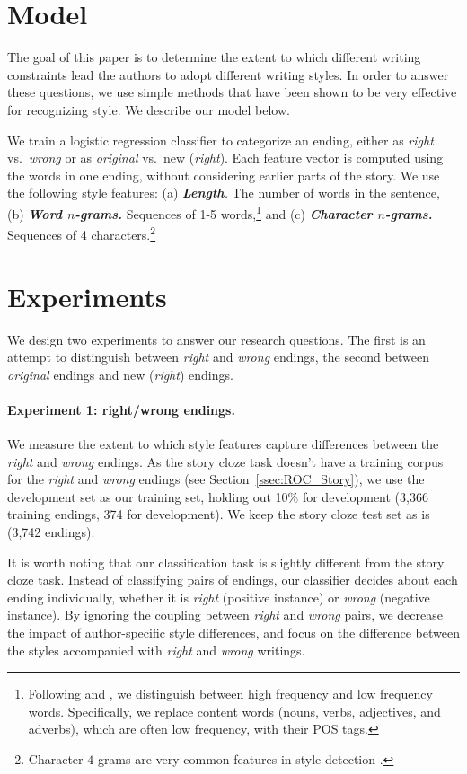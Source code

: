 \documentclass[11pt,a4paper]{article}
\newcommand{\secref}[1]{Section~\ref{ssec:#1}}
\newcommand{\isectionb}[1]{\section{#1}\label{ssec:#1}}
\newcommand{\resolved}[1]{}
\newcommand{\shortv}[1]{}
\newcommand{\roy}[1]{{\color{orange}\textsc{[#1 --rs]}}}
\newcommand{\nascomment}[1]{{\color{blue}\textsc{[#1 --nas]}}}
\renewcommand{\roy}[1]{{\color{orange}[#1 --rs]}}
\renewcommand{\roy}[1]{#1}
\renewcommand{\nascomment}[1]{}
\begin{document}
\isectionb{Model}

The goal of this paper is to determine the extent to which 
different writing constraints lead the authors to adopt different writing styles. 
In order to answer these questions, we use simple methods that have been shown to be very effective for recognizing style\shortv{ (see \secref{Related})}.
We describe our model below.

We train a logistic regression classifier to categorize an ending,
either as {\it right} vs.~{\it wrong} or as {\it original} vs.~new ({\it right}).
Each feature vector is computed using the words in one ending, without considering earlier parts of the story. 
We use the following style features: (a) \textit{\textbf{Length}.} The number of words in the sentence, 
(b) \textit{\textbf{Word $n$-grams.}} Sequences of 1-5
  words,\footnote{Following and \citet{Schwartz:2013}, we distinguish between high frequency and low frequency words. 
Specifically, we replace content words (nouns, verbs, adjectives, and adverbs), which are often low frequency, with their POS tags.}
and (c) \textit{\textbf{Character $n$-grams.}} \shortv{Character $n$-grams are one of the most useful features in identifying author style \cite{Stamatatos:2009}. 
We use character $4$-grams}\roy{Sequences of 4 characters}.\footnote{\roy{Character $4$-grams are very common features in style detection \cite{Stamatatos:2009}.}}


\isectionb{Experiments}
We design two experiments to answer our research questions. 
The first is an attempt to distinguish between {\it right} and {\it wrong} endings,
the second  between {\it original} endings and new ({\it right}) endings.
\shortv{We describe both experiments below.}

\paragraph{Experiment 1: right/wrong endings.}
We measure the extent to which  style features capture differences between the {\it right} and {\it wrong} endings.
As the story cloze task doesn't have a training corpus for the {\it
  right} and {\it wrong} endings (see \secref{ROC_Story}), we use the
development set as our training set, holding out 10\% for development
(3,366 training endings, 374 for development). 
 We keep the story cloze test set as is (3,742 endings).

It is worth noting that our classification task is slightly different from the story cloze task. 
Instead of classifying pairs of endings, \shortv{one which is {\it right} and
another which is {\it wrong}, }our classifier decides about each ending
individually, whether it is \emph{right} (positive instance) or
\emph{wrong} (negative instance).
By ignoring the coupling between {\it right} and {\it wrong} pairs, 
we \shortv{are able to }decrease the impact of author-specific style differences,
and focus on the difference between the styles accompanied with {\it right} and {\it wrong} writings.
\resolved{we
are able make a more general claim about the style used when writing
each of the tasks \nascomment{I'm not sure I follow this sentence; can
we be more clear?}.}
\end{document}

